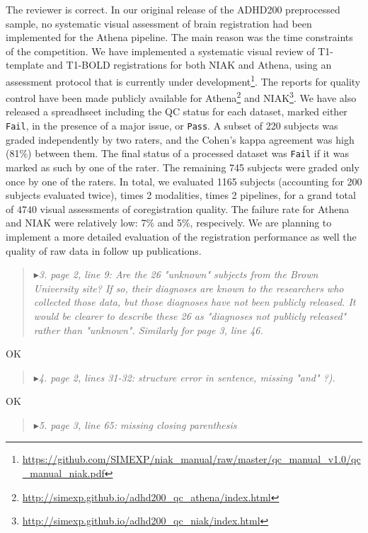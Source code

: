 \documentclass[authoryear,3p]{elsarticle}
\begin{document}
The reviewer is correct. In our original release of the ADHD200 preprocessed sample, no systematic visual assessment of brain registration had been implemented for the Athena pipeline. The main reason was the time constraints of the competition. We have implemented a systematic visual review of T1-template and T1-BOLD registrations for both NIAK and Athena, using an assessment protocol that is currently under development\footnote{\url{https://github.com/SIMEXP/niak_manual/raw/master/qc_manual_v1.0/qc_manual_niak.pdf}}. The reports for quality control have been made publicly available for Athena\footnote{\url{http://simexp.github.io/adhd200_qc_athena/index.html}} and NIAK\footnote{\url{http://simexp.github.io/adhd200_qc_niak/index.html}}. We have also released a spreadhseet including the QC status for each dataset, marked either \texttt{Fail}, in the presence of a major issue, or \texttt{Pass}. A subset of 220 subjects was graded independently by two raters, and the Cohen's kappa agreement was high (81\%) between them. The final status of a processed dataset was \texttt{Fail} if it was marked as such by one of the rater. The remaining 745 subjects were graded only once by one of the raters. In total, we evaluated 1165 subjects (accounting for 200 subjects evaluated twice), times 2 modalities, times 2 pipelines, for a grand total of $4740$ visual assessments of coregistration quality. The failure rate for Athena and NIAK were relatively low: 7\% and 5\%, respecively. We are planning to implement a more detailed evaluation of the registration performance as well the quality of raw data in follow up publications. 

\begin{quote}
$\blacktriangleright$\emph{3. page 2, line 9: Are the 26 "unknown" subjects from the Brown University site? If so, their diagnoses are known to the researchers who collected those data, but those diagnoses have not been publicly released. It would be clearer to describe these 26 as "diagnoses not publicly released" rather than "unknown". Similarly for page 3, line 46.}
\end{quote}

OK

\begin{quote}
$\blacktriangleright$\emph{4. page 2, lines 31-32: structure error in sentence, missing "and" ?). 
}
\end{quote}

OK

\begin{quote}
$\blacktriangleright$\emph{5. page 3, line 65: missing closing parenthesis}
\end{quote}
\end{document}

